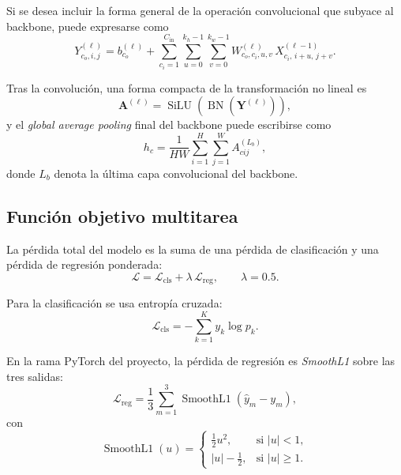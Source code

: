 \documentclass[11pt,a4paper]{article}
\begin{document}
Si se desea incluir la forma general de la operación convolucional que subyace al backbone, puede expresarse como
\begin{equation}
Y^{(\ell)}_{c_o,i,j} = b^{(\ell)}_{c_o} +
\sum_{c_i=1}^{C_{\mathrm{in}}}
\sum_{u=0}^{k_h-1}
\sum_{v=0}^{k_w-1}
W^{(\ell)}_{c_o,c_i,u,v}\,X^{(\ell-1)}_{c_i,\,i+u,\,j+v}.
\end{equation}

Tras la convolución, una forma compacta de la transformación no lineal es
\begin{equation}
\mathbf{A}^{(\ell)} = \operatorname{SiLU}\!\left(\operatorname{BN}\!\left(\mathbf{Y}^{(\ell)}\right)\right),
\end{equation}
y el \emph{global average pooling} final del backbone puede escribirse como
\begin{equation}
 h_c = \frac{1}{HW}\sum_{i=1}^{H}\sum_{j=1}^{W} A_{cij}^{(L_b)},
\end{equation}
donde $L_b$ denota la última capa convolucional del backbone.

\subsection{Función objetivo multitarea}

La pérdida total del modelo es la suma de una pérdida de clasificación y una pérdida de regresión ponderada:
\begin{equation}
\mathcal{L} = \mathcal{L}_{\mathrm{cls}} + \lambda\,\mathcal{L}_{\mathrm{reg}},
\qquad \lambda = 0.5.
\end{equation}

Para la clasificación se usa entropía cruzada:
\begin{equation}
\mathcal{L}_{\mathrm{cls}} = -\sum_{k=1}^{K} y_k\log p_k.
\end{equation}

En la rama PyTorch del proyecto, la pérdida de regresión es \emph{SmoothL1} sobre las tres salidas:
\begin{equation}
\mathcal{L}_{\mathrm{reg}} = \frac{1}{3}\sum_{m=1}^{3} \operatorname{SmoothL1}\!\left(\widehat y_m - y_m\right),
\end{equation}
con
\begin{equation}
\operatorname{SmoothL1}(u)=
\begin{cases}
\tfrac{1}{2}u^2, & \text{si } |u|<1,\\[4pt]
|u|-\tfrac{1}{2}, & \text{si } |u|\ge 1.
\end{cases}
\end{equation}
\end{document}

